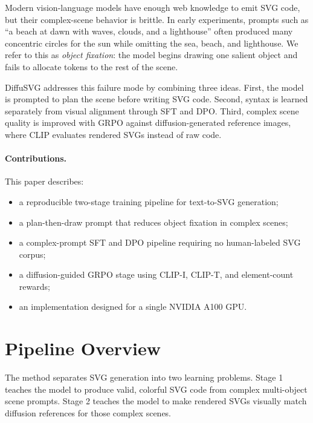 \documentclass[10pt,twocolumn]{article}
\begin{document}
Modern vision-language models have enough web knowledge to emit SVG code, but
their complex-scene behavior is brittle. In early experiments, prompts such as
``a beach at dawn with waves, clouds, and a lighthouse'' often produced many
concentric circles for the sun while omitting the sea, beach, and lighthouse.
We refer to this as \emph{object fixation}: the model begins drawing one
salient object and fails to allocate tokens to the rest of the scene.

DiffuSVG addresses this failure mode by combining three ideas. First, the
model is prompted to plan the scene before writing SVG code. Second, syntax is
learned separately from visual alignment through SFT and DPO. Third, complex
scene quality is improved with GRPO against diffusion-generated reference
images, where CLIP evaluates rendered SVGs instead of raw code.

\paragraph{Contributions.}
This paper describes:
\begin{itemize}
  \item a reproducible two-stage training pipeline for text-to-SVG generation;
  \item a plan-then-draw prompt that reduces object fixation in complex scenes;
  \item a complex-prompt SFT and DPO pipeline requiring no human-labeled SVG corpus;
  \item a diffusion-guided GRPO stage using CLIP-I, CLIP-T, and element-count
        rewards;
  \item an implementation designed for a single NVIDIA A100 GPU.
\end{itemize}

\section{Pipeline Overview}

The method separates SVG generation into two learning problems. Stage 1 teaches
the model to produce valid, colorful SVG code from complex multi-object scene
prompts. Stage 2 teaches the model to make rendered SVGs visually match
diffusion references for those complex scenes.
\end{document}
